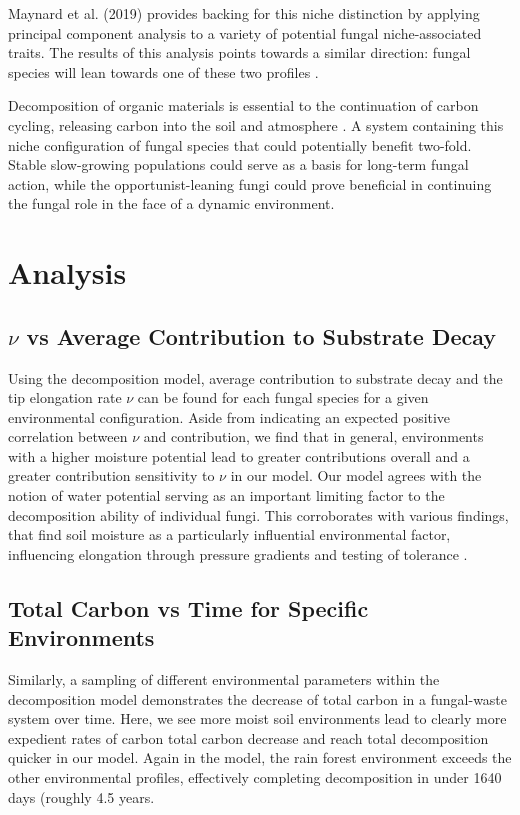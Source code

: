 \documentclass{article}
\begin{document}
Maynard et al. (2019) provides backing for this niche distinction by applying principal component analysis to a variety of potential fungal niche-associated traits. The results of this analysis points towards a similar direction: fungal species will lean towards one of these two profiles \cite{Maynard2019}.

Decomposition of organic materials is essential to the continuation of carbon cycling, releasing carbon into the soil and atmosphere \cite{Lustenhouwer2019}. A system containing this niche configuration of fungal species that could potentially benefit two-fold. Stable slow-growing populations could serve as a basis for long-term fungal action, while the opportunist-leaning fungi could prove beneficial in continuing the fungal role in the face of a dynamic environment.


\section{Analysis}
\subsection{$\nu$ vs Average Contribution to Substrate Decay} %
Using the decomposition model, average contribution to substrate decay and the tip elongation rate $\nu$ can be found for each fungal species for a given environmental configuration. Aside from indicating an expected positive correlation between $\nu$ and contribution, we find that in general, environments with a higher moisture potential lead to greater contributions overall and a greater contribution sensitivity to $\nu$ in our model. Our model agrees with the notion of water potential serving as an important limiting factor to the decomposition ability of individual fungi. This corroborates with various findings, that find soil moisture as a particularly influential environmental factor, influencing elongation through pressure gradients and testing of tolerance \cite{Maynard2019} \cite{Lustenhouwer2019}. %

\subsection{Total Carbon vs Time for Specific Environments} %
Similarly, a sampling of different environmental parameters within the decomposition model demonstrates the decrease of total carbon in a fungal-waste system over time. Here, we see more moist soil environments lead to clearly more expedient rates of carbon total carbon decrease and reach total decomposition quicker in our model. Again in the model, the rain forest environment exceeds the other environmental profiles, effectively completing decomposition in under 1640 days (roughly 4.5 years.
\end{document}
